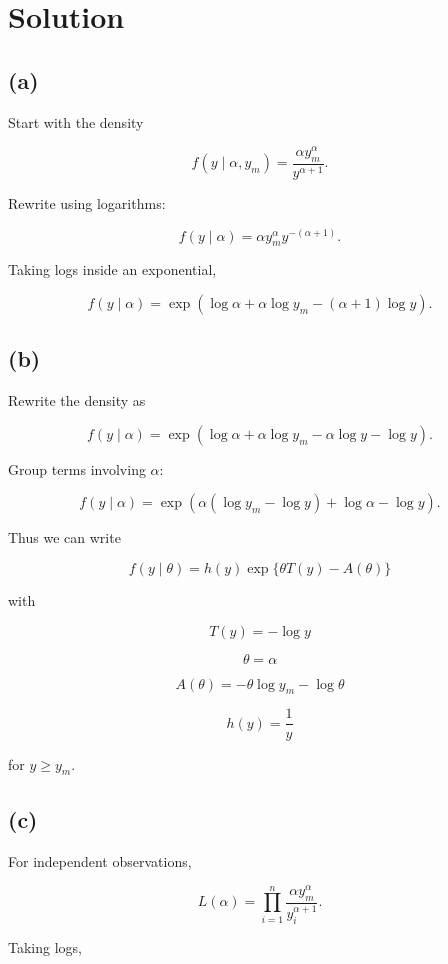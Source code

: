 \documentclass[12pt]{article}
\begin{document}
\section*{Solution}

\subsection*{(a)}

Start with the density

\[
f(y \mid \alpha,y_m)
=
\frac{\alpha y_m^\alpha}{y^{\alpha+1}}.
\]

Rewrite using logarithms:

\[
f(y \mid \alpha)
=
\alpha y_m^\alpha y^{-(\alpha+1)}.
\]

Taking logs inside an exponential,

\[
f(y \mid \alpha)
=
\exp
\left(
\log \alpha + \alpha \log y_m - (\alpha+1)\log y
\right).
\]

\subsection*{(b)}

Rewrite the density as

\[
f(y \mid \alpha)
=
\exp
\left(
\log \alpha + \alpha \log y_m - \alpha \log y - \log y
\right).
\]

Group terms involving $\alpha$:

\[
f(y \mid \alpha)
=
\exp
\left(
\alpha(\log y_m - \log y) + \log \alpha - \log y
\right).
\]

Thus we can write

\[
f(y \mid \theta)
=
h(y)\exp\{\theta T(y) - A(\theta)\}
\]

with

\[
T(y) = -\log y
\]

\[
\theta = \alpha
\]

\[
A(\theta) = -\theta \log y_m - \log \theta
\]

\[
h(y) = \frac{1}{y}
\]

for $y \ge y_m$.

\subsection*{(c)}

For independent observations,

\[
L(\alpha)
=
\prod_{i=1}^n
\frac{\alpha y_m^\alpha}{y_i^{\alpha+1}}.
\]

Taking logs,
\end{document}
